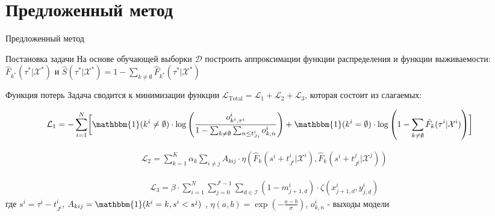 \documentclass[10pt,pdf,hyperref={unicode}]{beamer}
\begin{document}
\section{Предложенный метод}
\begin{frame}{Предложенный метод}
	
	\begin{block}{Постановка задачи}
		На основе обучающей выборки $\mathcal{D}$ построить аппроксимации функции распределения и функции выживаемости: $\hat{F}_{k^*}(\tau^*|\mathcal{X}^*)$ и $\hat{S}(\tau^{*}|\mathcal{X}^{*}) =1-\sum_{k\neq\emptyset}\hat{F}_{k^*}(\tau^*|\mathcal{X}^{*})$
	\end{block}
	
	\begin{block}{Функция потерь}
		Задача сводится к минимизации функции $\mathcal{L}_{\mathrm{Total}}=\mathcal{L}_1+\mathcal{L}_2+\mathcal{L}_3$, которая состоит из слагаемых:
		
		\scriptsize
		\[
		\begin{aligned}
			\mathcal{L}_{1} = -\sum_{i=1}^N \biggl[ 
			&\mathbbm{1}(k^i\neq\emptyset)\cdot\log\left(
			\frac{o_{k^i,\tau^i}^i}{
				1-\sum_{k\neq\emptyset}\sum_{n\leq t_{Ji}^i}o_{k,n}^i}
			\right) 
			 +\mathbbm{1}(k^i=\emptyset)\cdot\log\left(
			1-\sum_{k\neq\emptyset}\hat{F}_k(\tau^i|\mathcal{X}^i)
			\right)
			\biggr]
		\end{aligned}
		\]
		
		
		\scriptsize
		\[
		\begin{aligned}
		\mathcal{L}_2=\sum_{k=1}^K\alpha_k\sum_{i\neq j}A_{kij}\cdot\eta\left(\hat{F}_k(s^i+t_{J^i}^i|\mathcal{X}^i),\hat{F}_k(s^i+t_{J^j}^j|\mathcal{X}^j)\right)
		\end{aligned}
		\]
		
		\scriptsize
		\[
		\begin{aligned}
		\mathcal{L}_3=\beta\cdot\sum_{i=1}^N\sum_{j=0}^{J^i-1}\sum_{d\in\mathcal{I}}(1-m_{j+1,d}^i)\cdot\zeta(x_{j+1,d}^i,y_{j,d}^i)	
		\end{aligned}
		\]
		где $s^i=\tau^i-t_{J^i}^i$, $A_{kij}=\mathbbm{1}(k^i=k,s^i<s^j)$ , $\eta(a,b)=\exp\left(-\frac{a-b}{\sigma}\right)$, $o_{k,n}^i$ - выходы модели

	\end{block}
	

	
	
\end{frame}
\end{document}
